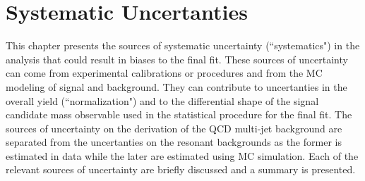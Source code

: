 \chapter{Systematic Uncertanties} \label{chap:systematics}

This chapter presents the sources of systematic uncertainty (``systematics") in
the analysis that could result in biases to the final fit.  These sources of
uncertainty can come from experimental calibrations or procedures and from the
MC modeling of signal and background. They can contribute to uncertanties in
the overall yield (``normalization") and to the differential shape of the
signal candidate mass observable used in the statistical procedure for the
final fit.  The sources of uncertainty on the derivation of the QCD multi-jet
background are separated from the uncertanties on the resonant backgrounds as
the former is estimated in data while the later are estimated using MC
simulation.  Each of the relevant sources of uncertainty are briefly discussed
and a summary is presented.




